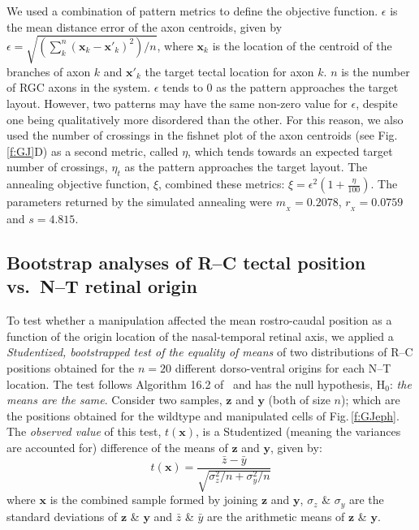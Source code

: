 \documentclass[9pt]{elife} %
\begin{document}
We used a combination of pattern metrics to define the objective function. $\epsilon$ is the mean distance error of the axon centroids, given by $\epsilon = \sqrt{\left(\sum_k^n (\mathbf{x}_{k} - \mathbf{x}'_{k})^2\right)/n}$,
%
%
where $\mathbf{x}_{k}$ is the location of the centroid of the branches of axon $k$ and $\mathbf{x}'_{k}$ the target tectal location for axon $k$.
$n$ is the number of RGC axons in the system.
%
$\epsilon$ tends to 0 as the pattern approaches the target layout.
However, two patterns may have the same non-zero value for $\epsilon$, despite one being qualitatively more disordered than the other.
For this reason, we also used the number of crossings in the fishnet plot of the axon centroids (see Fig.\,\ref{f:GJ}D) as a second metric, called $\eta$, which tends towards an expected target number of crossings, $\eta_t$ as the pattern approaches the target layout. The annealing objective function, $\xi$, combined these metrics: $\xi = \epsilon^2 (1+\frac{\eta}{100})$.
The parameters returned by the simulated annealing were
$m_{\!_X} = 0.2078$, $r_{\!_X} = 0.0759$ and $s = 4.815$.

\subsection*{Bootstrap analyses of R--C tectal position vs.~N--T retinal origin}

To test whether a manipulation affected the mean rostro-caudal position as a function of the origin location of the nasal-temporal retinal axis, we applied a \emph{Studentized, bootstrapped test of the equality of means} of two distributions of R--C positions obtained for the $n=20$ different dorso-ventral origins for each N--T location.
The test follows Algorithm 16.2 of~\cite{efron_introduction_1993} and has the null hypothesis, H$_0$: \emph{the means are the same}.
Consider two samples, $\textbf{z}$ and $\textbf{y}$ (both of size $n$); which are the positions obtained for the wildtype and manipulated cells of Fig.\,\ref{f:GJeph}.
The \emph{observed value} of this test, $t(\textbf{x})$, is a Studentized (meaning the variances are accounted for) difference of the means of $\textbf{z}$ and $\textbf{y}$, given by:
%
$$t(\textbf{x}) =  \frac{\bar{z} - \bar{y}}{\sqrt{\sigma_{z}^2/n + \sigma_{y}^2/n} } $$
%
where $\textbf{x}$ is the combined sample formed by joining $\textbf{z}$ and $\textbf{y}$, $\sigma_z$ \& $\sigma_y$ are the standard deviations of $\textbf{z}$ \& $\textbf{y}$ and $\bar{z}$ \& $\bar{y}$ are the arithmetic means of $\textbf{z}$ \& $\textbf{y}$.
\end{document}
